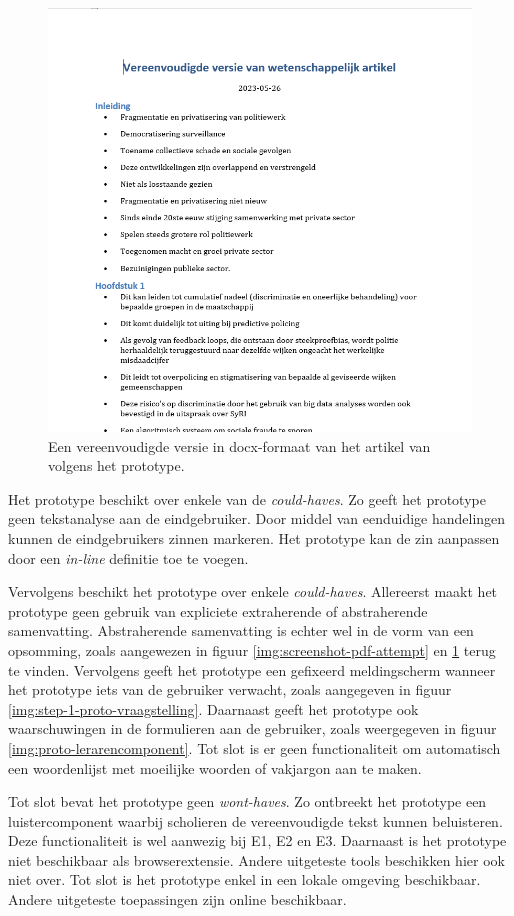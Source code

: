 \begin{figure}
	\includegraphics[width=\linewidth]{img/screenshot-prototype-word.png}
	\caption{Een vereenvoudigde versie in docx-formaat van het artikel van \textcite{VanBrakel2022} volgens het prototype.}
	\label{img:screenshot-docx-attempt}
\end{figure}

Het prototype beschikt over enkele van de \textit{could-haves}. Zo geeft het prototype geen tekstanalyse aan de eindgebruiker. Door middel van eenduidige handelingen kunnen de eindgebruikers zinnen markeren. Het prototype kan de zin aanpassen door een \textit{in-line} definitie toe te voegen. 

\medspace

Vervolgens beschikt het prototype over enkele \textit{could-haves}. Allereerst maakt het prototype geen gebruik van expliciete extraherende of abstraherende samenvatting. Abstraherende samenvatting is echter wel in de vorm van een opsomming, zoals aangewezen in figuur \ref{img:screenshot-pdf-attempt} en \ref{img:screenshot-docx-attempt} terug te vinden. Vervolgens geeft het prototype een gefixeerd meldingscherm wanneer het prototype iets van de gebruiker verwacht, zoals aangegeven in figuur \ref{img:step-1-proto-vraagstelling}. Daarnaast geeft het prototype ook waarschuwingen in de formulieren aan de gebruiker, zoals weergegeven in figuur \ref{img:proto-lerarencomponent}. Tot slot is er geen functionaliteit om automatisch een woordenlijst met moeilijke woorden of vakjargon aan te maken.

\medspace

Tot slot bevat het prototype geen \textit{wont-haves}. Zo ontbreekt het prototype een luistercomponent waarbij scholieren de vereenvoudigde tekst kunnen beluisteren. Deze functionaliteit is wel aanwezig bij E1, E2 en E3. Daarnaast is het prototype niet beschikbaar als browserextensie. Andere uitgeteste tools beschikken hier ook niet over. Tot slot is het prototype enkel in een lokale omgeving beschikbaar. Andere uitgeteste toepassingen zijn online beschikbaar. 